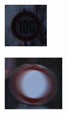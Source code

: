 \begin{figure}[H]
\begin{subfigure}[b]{0.125\textwidth}
       \caption{}
       \label{fig:gtrsb-paper-bsp-image-2}
   \end{subfigure}
   \hspace{3em}%
   \begin{subfigure}[b]{0.125\textwidth}
       \centering
       \includegraphics[height=\textwidth]{../images/GTSRB/00040.png}
       \caption{}
       \label{fig:gtrsb-paper-bsp-image-3}
   \end{subfigure}
   \hspace{3em}%
   \begin{subfigure}[b]{0.125\textwidth}
    \centering
    \includegraphics[height=\textwidth]{../images/GTSRB/00052.png}

\end{subfigure}
\end{figure}
